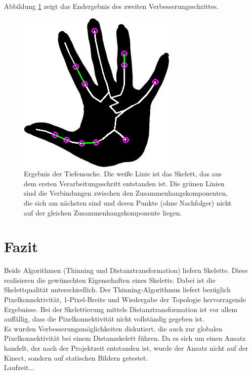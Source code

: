 Abbildung \ref{fig:hand-DFS-endergebnis} zeigt das Endergebnis 
des zweiten Verbesserungsschrittes. 
\begin{figure}[htbp]
\centering
\includegraphics[width=0.4\linewidth]{./fig/hand-DFS-endergebnis}
\caption{Ergebnis der Tiefensuche. Die weiße Linie ist das Skelett,
das aus dem ersten Verarbeitungsschritt entstanden ist. Die grünen
Linien sind die Verbindungen zwischen den Zusammenhangskomponenten,
die sich am nächsten sind und deren Punkte (ohne Nachfolger) nicht
auf der gleichen Zusammenhangskomponente liegen.}
\label{fig:hand-DFS-endergebnis}
\end{figure}
\clearpage
\section{Fazit}
Beide Algorithmen (Thinning und Distanztransformation) liefern 
Skelette. Diese realisieren die gewünschten Eigenschaften eines
Skeletts. Dabei ist die Skelettqualität unterschiedlich. Der
Thinning-Algorithmus liefert bezüglich Pixelkonnektivität, 
1-Pixel-Breite und Wiedergabe der Topologie hervorragende Ergebnisse. Bei der Skelettierung mittels Distanztransformation
ist vor allem auffällig, dass die Pixelkonnektivität nicht vollständig gegeben ist. \\
Es wurden Verbesserungsmöglichkeiten diskutiert, die auch zur globalen Pixelkonnektivität bei einem Distanzskelett führen. 
Da es sich um einen Ansatz handelt, der nach der Projektzeit 
entstanden ist, wurde der Ansatz nicht auf der Kinect, sondern auf
statischen Bildern getestet. \\
Laufzeit...
